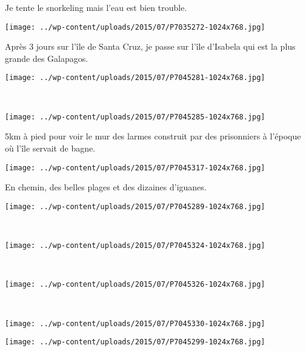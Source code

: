 Je tente le snorkeling mais l'eau est bien trouble. 
\begin{center} \texttt{[image: ../wp-content/uploads/2015/07/P7035272-1024x768.jpg]} \end{center}
\vspace{-\topsep}
\pagebreak

Après 3 jours sur l'île de Santa Cruz, je passe sur l'île d'Isabela qui est la plus grande des Galapagos. 
\begin{center} \texttt{[image: ../wp-content/uploads/2015/07/P7045281-1024x768.jpg]} \end{center}
~
\begin{center} \texttt{[image: ../wp-content/uploads/2015/07/P7045285-1024x768.jpg]} \end{center}
\vspace{-\topsep}
\pagebreak

5km à pied pour voir le mur des larmes construit par des prisonniers à l'époque où l'île servait de bagne. 
\begin{center} \texttt{[image: ../wp-content/uploads/2015/07/P7045317-1024x768.jpg]} \end{center}

En chemin, des belles plages et des dizaines d'iguanes. 
\begin{center} \texttt{[image: ../wp-content/uploads/2015/07/P7045289-1024x768.jpg]} \end{center}
\vspace{-\topsep}
\pagebreak
~\\
\begin{center} \texttt{[image: ../wp-content/uploads/2015/07/P7045324-1024x768.jpg]} \end{center}
~
\begin{center} \texttt{[image: ../wp-content/uploads/2015/07/P7045326-1024x768.jpg]} \end{center}
\vspace{-\topsep}
\pagebreak
~
\begin{center} \texttt{[image: ../wp-content/uploads/2015/07/P7045330-1024x768.jpg]} \end{center}
\begin{center} \texttt{[image: ../wp-content/uploads/2015/07/P7045299-1024x768.jpg]} \end{center}
\vspace{-\topsep}
\vspace{-3.25mm}
\pagebreak

